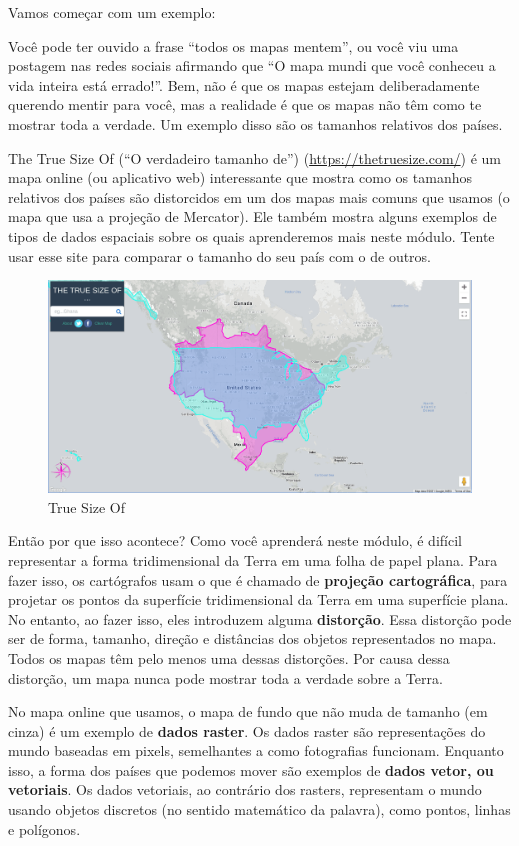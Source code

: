 \documentclass[
]{krantz}
\begin{document}
Vamos começar com um exemplo:

Você pode ter ouvido a frase ``todos os mapas mentem'', ou você viu uma postagem nas redes sociais afirmando que ``O mapa mundi que você conheceu a vida inteira está errado!''. Bem, não é que os mapas estejam deliberadamente querendo mentir para você, mas a realidade é que os mapas não têm como te mostrar toda a verdade. Um exemplo disso são os tamanhos relativos dos países.

The True Size Of (``O verdadeiro tamanho de'') (\url{https://thetruesize.com/}) é um mapa online (ou aplicativo web) interessante que mostra como os tamanhos relativos dos países são distorcidos em um dos mapas mais comuns que usamos (o mapa que usa a projeção de Mercator). Ele também mostra alguns exemplos de tipos de dados espaciais sobre os quais aprenderemos mais neste módulo. Tente usar esse site para comparar o tamanho do seu país com o de outros.

\begin{figure}
\centering
\includegraphics{media/modulo0/true-size-of.png}
\caption{True Size Of}
\end{figure}

Então por que isso acontece? Como você aprenderá neste módulo, é difícil representar a forma tridimensional da Terra em uma folha de papel plana. Para fazer isso, os cartógrafos usam o que é chamado de \textbf{projeção cartográfica}, para projetar os pontos da superfície tridimensional da Terra em uma superfície plana. No entanto, ao fazer isso, eles introduzem alguma \textbf{distorção}. Essa distorção pode ser de forma, tamanho, direção e distâncias dos objetos representados no mapa. Todos os mapas têm pelo menos uma dessas distorções. Por causa dessa distorção, um mapa nunca pode mostrar toda a verdade sobre a Terra.

No mapa online que usamos, o mapa de fundo que não muda de tamanho (em cinza) é um exemplo de \textbf{dados raster}. Os dados raster são representações do mundo baseadas em pixels, semelhantes a como fotografias funcionam. Enquanto isso, a forma dos países que podemos mover são exemplos de \textbf{dados vetor, ou vetoriais}. Os dados vetoriais, ao contrário dos rasters, representam o mundo usando objetos discretos (no sentido matemático da palavra), como pontos, linhas e polígonos.
\end{document}
